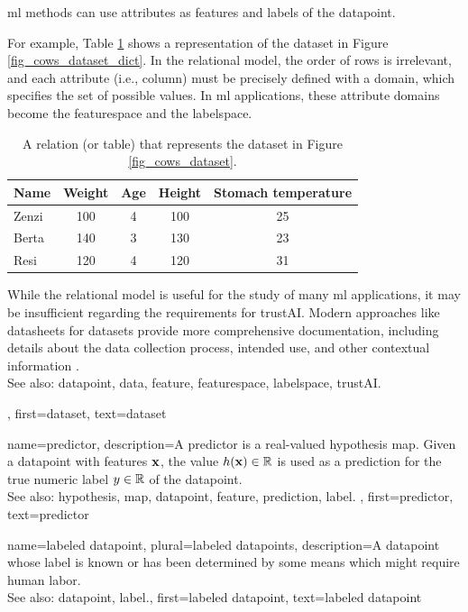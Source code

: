 {{\begin{itemize}
		\gls{ml} methods can use attributes as \glspl{feature} and \glspl{label} of the \gls{datapoint}.
		\end{itemize}
		For example, Table \ref{tab:cowdata_dict} shows a representation of the dataset in Figure \ref{fig_cows_dataset_dict}. 
		In the relational \gls{model}, the order of rows is irrelevant, and each attribute (i.e., column) must be 
		precisely defined with a domain, which specifies the set of possible values. In \gls{ml} applications, 
		these attribute domains become the \gls{featurespace} and the \gls{labelspace}.
		\begin{table}[H]
			\centering
			\begin{tabular}{lcccc}
				\hline
				\textbf{Name} & \textbf{Weight} & \textbf{Age} & \textbf{Height} & \textbf{Stomach temperature} \\
				\hline
				Zenzi & 100 & 4 & 100 & 25 \\
				Berta & 140 & 3 & 130 & 23 \\
				Resi  & 120 & 4 & 120 & 31 \\
				\hline
			\end{tabular}
			\caption{A relation (or table) that represents the dataset in Figure \ref{fig_cows_dataset}.}
			\label{tab:cowdata_dict}
		\end{table}
 While the relational \gls{model} is useful for the study of many \gls{ml} applications, it may be 
 insufficient regarding the requirements for \gls{trustAI}. Modern 
 approaches like datasheets for datasets provide more comprehensive 
 documentation, including details about the \gls{data} collection process, intended 
 use, and other contextual information \cite{DatasheetData2021}.
 		\\
		See also: \gls{datapoint}, \gls{data}, \gls{feature}, \gls{featurespace}, \gls{labelspace}, \gls{trustAI}.},
 first={dataset},
 text={dataset}  
}

{name={predictor},
	description={A predictor is a real-valued \gls{hypothesis} \gls{map}. 
		Given a \gls{datapoint} with \glspl{feature} ${\bf x}$, the value 
		$h({\bf x}) \in \mathbb{R}$ is used as a \gls{prediction} for the true 
		numeric \gls{label} $y \in \mathbb{R}$ of the \gls{datapoint}.
				\\
		See also: \gls{hypothesis}, \gls{map}, \gls{datapoint}, \gls{feature}, \gls{prediction}, \gls{label}. },
	first={predictor},
	text={predictor}  
}

{name={labeled datapoint}, plural={labeled datapoints},
 	description={A \gls{datapoint} whose \gls{label} is known or has been determined 
 		by some means which might require human labor.
			\\
		See also: \gls{datapoint}, \gls{label}.},
 	first={labeled datapoint},
 	text={labeled datapoint}  
}

